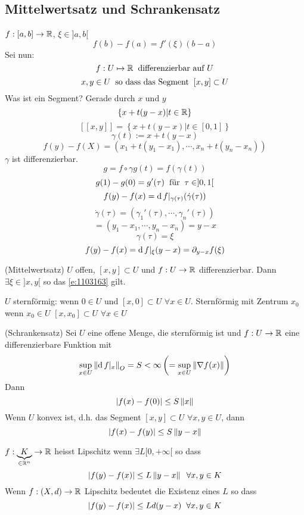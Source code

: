 \subsection{Mittelwertsatz und Schrankensatz}
  $f:[a,b]\rightarrow\mathbb{R}$, $\xi\in ]a,b[$
  \[f(b)-f(a)=f'(\xi)(b-a)\]
  Sei nun:
  \[f:U\mapsto\mathbb{R}\hspace{2mm}\text{differenzierbar auf $U$}\]
  \[x,y\in U\hspace{2mm}\text{so dass das Segment}\hspace{2mm}[x,y]\subset U\]
  Was ist ein Segment? Gerade durch $x$ und $y$
  \[\left\{ x+t(y-x)|t\in \mathbb{R} \right\}\]
  \[\left[ [x,y] \right]=\left\{ x+t(y-x)|t\in \left[ 0,1 \right] \right\}\]
  \[\gamma(t):= x+t(y-x)\]
  \[f(y)-f(X)=\left( x_1+t(y_1-x_1),\cdots,x_n+t(y_n-x_n) \right)\]
  $\gamma$ ist differenzierbar.
  \[g=f\circ \gamma g(t)=f(\gamma(t))\]
  \[g(1)-g(0)=g'(\tau)\hspace{2mm}\text{für}\hspace{2mm} \tau\in ]0,1[\]
  \[f(y)-f(x)=\operatorname{d} f|_{\gamma(\tau)}(\dot\gamma(\tau))\]
  \[\dot\gamma(\tau)=(\gamma_1'(\tau),\cdots,\gamma_n'(\tau))\]
  \[=(y_1-x_1,\cdots,y_n-x_n)=y-x\]
  \[\gamma(\tau)=\xi\]
  \begin{equation}
    \label{e:1103163}
    f(y)-f(x)=\operatorname{d} f|_\xi(y-x)=\partial_{y-x}f(\xi)
  \end{equation}
\begin{Sat}
  (Mittelwertsatz) $U$ offen, $[x,y]\subset U$ und $f:U\rightarrow\mathbb{R}$ differenzierbar. Dann $\exists \xi\in ]x,y[$ so das \ref{e:1103163} gilt.
\end{Sat}
\begin{Def}
  $U$ sternförmig: wenn $0\in U$ und $[x,0]\subset U$ $\forall x\in U$. Sternförmig mit Zentrum $x_0$ wenn $x_0\in U$ $[x,x_0]\subset U$ $\forall x\in U$
\end{Def}
\begin{Sat}
  (Schrankensatz) Sei $U$ eine offene Menge, die sternförmig ist und $f:U\rightarrow\mathbb{R}$ eine differenzierbare Funktion mit
  \[\sup_{x\in U}\left\| \operatorname{d} f|_x \right\|_{O}=S<\infty \left( =\sup_{x\in U}\left\| \nabla f(x) \right\| \right)\]
  Dann
  \[\mathopen| f(x)-f(0) \mathclose|\leq S\left\| x \right\|\]
  Wenn $U$ konvex ist, d.h. das Segment $[x,y]\subset U$ $\forall x,y\in U$, dann
  \[\mathopen| f(x)-f(y) \mathclose|\leq S\left\| y-x \right\|\]
\end{Sat}
\begin{Def}
  $f:\underbrace{K}_{\in \mathbb{R}^n}\rightarrow\mathbb{R}$ heisst Lipschitz wenn $\exists L[0,+\infty[$ so dass
  \[\mathopen| f(y)-f(x) \mathclose|\leq L\left\| y-x \right\|\hspace{2mm}\forall x,y\in K\]
  Wenn $f:(X,d)\rightarrow\mathbb{R}$ Lipschitz bedeutet die Existenz eines $L$ so dass
  \[\mathopen| f(y)-f(x) \mathclose|\leq L d(y-x)\hspace{2mm}\forall x,y\in K\]
\end{Def}
